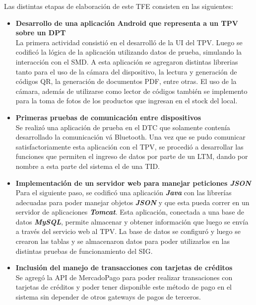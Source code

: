 Las distintas etapas de elaboraci\'on de este \ac{TFE} consisten en las siguientes:

\begin{itemize}
	\item \textbf{Desarrollo de una aplicaci\'on Android\Si{\texttrademark} que representa a un \ac{TPV} sobre un \ac{DPT}}\\
	  La primera actividad consisti\'o en el desarroll\'o de la \ac{UI} del \ac{TPV}. Luego se codific\'o la l\'ogica de la aplicaci\'on utilizando datos de prueba, simulando la interacci\'on con el \ac{SMD}. A esta aplicaci\'on se agregaron distintas librerias tanto para el uso de la c\'amara del dispositivo, la lectura y generaci\'on de c\'odigos \ac{QR}, la generaci\'on de documentos PDF, entre otras. El uso de la c\'amara, adem\'as de utilizarse como lector de c\'odigos tambi\'en se implemento para la toma de fotos de los productos que ingresan en el stock del local.
	
	\item \textbf{Primeras pruebas de comunicaci\'on entre dispositivos}\\
  	Se realiz\'o una aplicaci\'on de prueba en el \ac{DTC} que solamente conten\'ia desarrollado la comunicaci\'on v\'a Bluetooth\Si{\texttrademark}. Una vez que se pudo comunicar satisfactoriamente esta aplicaci\'on con el \ac{TPV}, se procedi\'o a desarrollar las funciones que permiten el ingreso de datos por parte de un \ac{LTM}, dando por nombre a esta parte del sistema el de una \ac{TID}.
	
	\item \textbf{Implementaci\'on de un servidor web para manejar peticiones \textbf{\textit{JSON}}}\\
		Para el siguiente paso, se codific\'o una aplicaci\'on \textbf{\textit{Java}} con las librer\'ias adecuadas para poder manejar objetos \textbf{\textit{JSON}} y que esta pueda correr en un servidor de aplicaciones \textbf{\textit{Tomcat}}. Esta aplicaci\'on, conectada a una base de datos \textbf{\textit{MySQL}}, permite almacenar y obtener informaci\'on que luego se env\'ia a trav\'es del servicio web al \ac{TPV}. La base de datos se configur\'o y luego se crearon las tablas y se almacenaron datos para poder utilizarlos en las distintas pruebas de funcionamiento del \ac{SIG}.

	\item \textbf{Inclusi\'on del manejo de transacciones con tarjetas de cr\'editos}\\
		Se agreg\'o la \ac{API} de MercadoPago\Si{\texttrademark} para poder realizar transaciones con tarjetas de cr\'editos y poder tener disponible este m\'etodo de pago en el sistema sin depender de otros gateways de pagos de terceros.


\end{itemize}
